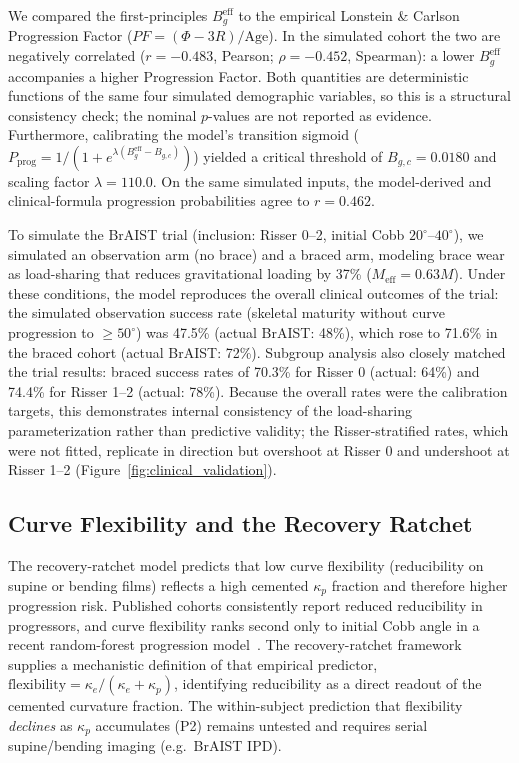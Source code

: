 We compared the first-principles $B_g^{\mathrm{eff}}$ to the empirical Lonstein \& Carlson Progression Factor ($PF = (\Phi - 3R)/\mathrm{Age}$). In the simulated cohort the two are negatively correlated ($r = -0.483$, Pearson; $\rho = -0.452$, Spearman): a lower $B_g^{\mathrm{eff}}$ accompanies a higher Progression Factor. Both quantities are deterministic functions of the same four simulated demographic variables, so this is a structural consistency check; the nominal $p$-values are not reported as evidence. Furthermore, calibrating the model's transition sigmoid ($P_{\mathrm{prog}} = 1 / (1 + e^{\lambda (B_g^{\mathrm{eff}} - B_{g,c})})$) yielded a critical threshold of $B_{g,c} = 0.0180$ and scaling factor $\lambda = 110.0$. On the same simulated inputs, the model-derived and clinical-formula progression probabilities agree to $r = 0.462$.

To simulate the BrAIST trial (inclusion: Risser 0--2, initial Cobb $20^\circ$--$40^\circ$), we simulated an observation arm (no brace) and a braced arm, modeling brace wear as load-sharing that reduces gravitational loading by 37\% ($M_{\mathrm{eff}} = 0.63 M$). Under these conditions, the model reproduces the overall clinical outcomes of the trial: the simulated observation success rate (skeletal maturity without curve progression to $\ge 50^\circ$) was 47.5\% (actual BrAIST: 48\%), which rose to 71.6\% in the braced cohort (actual BrAIST: 72\%). Subgroup analysis also closely matched the trial results: braced success rates of 70.3\% for Risser 0 (actual: 64\%) and 74.4\% for Risser 1--2 (actual: 78\%). Because the overall rates were the calibration targets, this demonstrates internal consistency of the load-sharing parameterization rather than predictive validity; the Risser-stratified rates, which were not fitted, replicate in direction but overshoot at Risser 0 and undershoot at Risser 1--2 (Figure~\ref{fig:clinical_validation}).

\subsection{Curve Flexibility and the Recovery Ratchet}

The recovery-ratchet model predicts that low curve flexibility (reducibility on supine or bending films) reflects a high cemented $\kappa_p$ fraction and therefore higher progression risk. Published cohorts consistently report reduced reducibility in progressors, and curve flexibility ranks second only to initial Cobb angle in a recent random-forest progression model~\cite{cheung2020supine, ohrtnissen2016flexibility, alfraihat2022random}. The recovery-ratchet framework supplies a mechanistic definition of that empirical predictor, $\mathrm{flexibility} = \kappa_e/(\kappa_e + \kappa_p)$, identifying reducibility as a direct readout of the cemented curvature fraction. The within-subject prediction that flexibility \emph{declines} as $\kappa_p$ accumulates (P2) remains untested and requires serial supine/bending imaging (e.g.\ BrAIST IPD).

